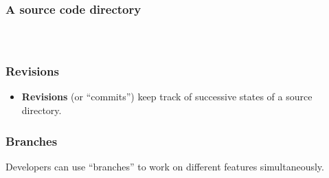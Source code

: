 \documentclass[aspectratio=169,xcolor=table]{beamer}
\begin{document}
    \begin{frame}
        \frametitle{A source code directory}

        \begin{columns}
            \begin{figure}
                \begin{minipage}{\textwidth}
            \end{minipage}
            \end{figure}
            \begin{figure}
                \centering
                \scalebox{0.9}{}
            \end{figure}
        \end{columns}
    \end{frame}

    \begin{frame}
        \frametitle{Revisions}
        \begin{block}{}
            \begin{itemize}
                \item \textbf{Revisions} (or ``commits'') keep track of
                    successive states of a source directory.
            \end{itemize}
        \end{block}
        \vfill
        \begin{figure}
            \centering
            \scalebox{0.8}{}
        \end{figure}
    \end{frame}

    \begin{frame}
        \frametitle{Branches}

        \begin{block}{}
            Developers can use ``branches'' to work on different features
            simultaneously.
        \end{block}
        \vfill
        \begin{figure}
            \centering
            \scalebox{0.8}{}
        \end{figure}
    \end{frame}
\end{document}
